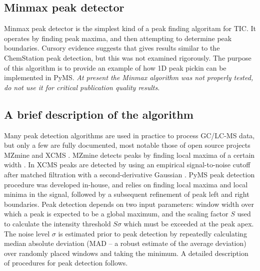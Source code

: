 \subsection{Minmax peak detector}

Minmax peak detector is the simplest kind of a peak finding algoritam for
TIC. It operates by finding peak maxima, and then attempting to determine
peak boundaries. Cursory evidence suggests that gives results similar to
the ChemStation peak detection, but this was not examined rigorously.
The purpose of this algorithm is to provide an example of how 1D peak
pickin can be implemented in PyMS. {\em At present the Minmax algorithm
was not properly tested, do not use it for critical publication quality
results}.

\subsection{A brief description of the algorithm}

Many peak detection algorithms are used in practice to process GC/LC-MS data,
but only a few are fully documented, most notable those of open source
projects MZmine \cite{katajamaa06} and XCMS \cite{smith06}.  MZmine detects
peaks by finding local maxima of a certain width \cite{katajamaa06}. In XCMS
peaks are detected by using an empirical signal-to-noise cutoff after matched
filtration with a second-derivative Gaussian \cite{smith06}. PyMS peak
detection procedure was developed in-house, and relies on finding local
maxima and local minima in the signal, followed by a subsequent refinement
of peak left and right boundaries. Peak detection depends on two input
parameters: window width over which a peak is expected to be a global maximum,
and the scaling factor $S$ used to calculate the intensity threshold $S
\sigma$ which must be exceeded at the peak apex. The noise level $\sigma$
is estimated prior to peak detection by repeatedly calculating median
absolute deviation (MAD -- a robust estimate of the average deviation) over
randomly placed windows and taking the minimum. A detailed description of
procedures for peak detection follows. 

